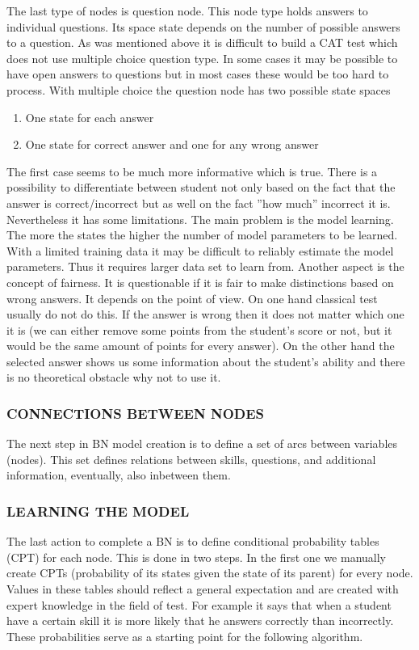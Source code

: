 The last type of nodes is question node. This node type holds answers to individual questions. Its space state depends on the number of possible answers to a question. As was mentioned above it is difficult to build a CAT test which does not use multiple choice question type. In some cases it may be possible to have open answers to questions but in most cases these would be too hard to process. With multiple choice the question node has two possible state spaces
\begin{enumerate}
	\item One state for each answer
	\item One state for correct answer and one for any wrong answer
\end{enumerate}
The first case seems to be much more informative which is true. There is a possibility to differentiate between student not only based on the fact that the answer is correct/incorrect but as well on the fact ''how much'' incorrect it is. Nevertheless it has some limitations. The main problem is the model learning. The more the states the higher the number of model parameters to be learned. With a limited training data it may be difficult to reliably estimate the model parameters. Thus it requires larger data set to learn from. Another aspect is the concept of fairness. It is questionable if it is fair to make distinctions based on wrong answers. It depends on the point of view. On one hand classical test usually do not do this. If the answer is wrong then it does not matter which one it is (we can either remove some points from the student's score or not, but it would be the same amount of points for every answer). On the other hand the selected answer shows us some information about the student's ability and there is no theoretical obstacle why not to use it.

\subsubsection{CONNECTIONS BETWEEN NODES}

The next step in BN model creation is to define a set of arcs between variables (nodes). This set defines relations between skills, questions, and additional information, eventually, also inbetween them.  

\subsubsection{LEARNING THE MODEL}
The last action to complete a BN is to define conditional probability tables (CPT) for each node. This is done in two steps. In the first one we manually create CPTs (probability of its states given the state of its parent) for every node. Values in these tables should reflect a general expectation and are created with expert knowledge in the field of test. For example it says that when a student have a certain skill it is more likely that he answers correctly than incorrectly. These probabilities serve as a starting point for the following algorithm.

